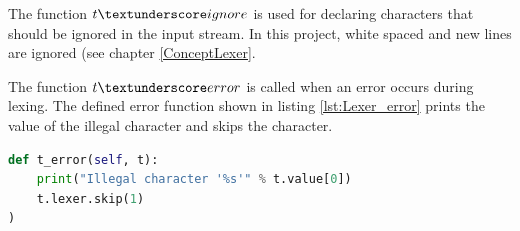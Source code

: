 The function $t\textunderscore ignore$ is used for declaring characters that should be ignored in the input stream. In this project, white spaced and new lines are ignored (see chapter \ref{ConceptLexer}.

The function $t\textunderscore error$ is called when an error occurs during lexing. The defined error function shown in listing \ref{lst:Lexer_error} prints the value of the illegal character and skips the character. \\

\begin{lstlisting}[language=Python,basicstyle=\scriptsize	,caption= Lexer error function,label= lst:Lexer_error]
def t_error(self, t):
    print("Illegal character '%s'" % t.value[0])
    t.lexer.skip(1)
)
\end{lstlisting}


